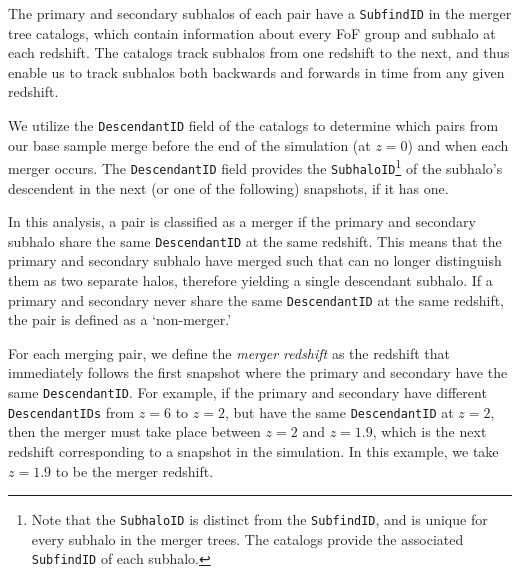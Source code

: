 \documentclass[twocolumn,linenumbers]{aastex631}
\begin{document}
The primary and secondary subhalos of each pair have a \texttt{SubfindID} in the \subfind{} merger tree catalogs, which contain information about every FoF group and subhalo at each redshift. 
The \sublink{} catalogs track subhalos from one redshift to the next, and thus enable us to track subhalos both backwards and forwards in time from any given redshift. 

We utilize the \texttt{DescendantID} field of the \sublink{} catalogs to determine which pairs from our base sample merge before the end of the simulation (at $z=0$) and when each merger occurs. 
The \texttt{DescendantID} field provides the \texttt{SubhaloID}\footnote{Note that the \texttt{SubhaloID} is distinct from the \texttt{SubfindID}, and is unique for every subhalo in the merger trees. 
The \sublink{} catalogs provide the associated \texttt{SubfindID} of each subhalo.} of the subhalo's descendent in the next (or one of the following) snapshots, if it has one. 

In this analysis, a pair is classified as a merger if the primary and secondary subhalo share the same \texttt{DescendantID} at the same redshift. 
This means that the primary and secondary subhalo have merged such that \subfind{} can no longer distinguish them as two separate halos, therefore yielding a single descendant subhalo.
If a primary and secondary never share the same \texttt{DescendantID} at the same redshift, the pair is defined as a `non-merger.'

For each merging pair, we define the \emph{merger redshift} as the redshift that immediately follows the first snapshot where the primary and secondary have the same \texttt{DescendantID}. 
For example, if the primary and secondary have different \texttt{DescendantIDs} from $z=6$ to $z=2$, but have the same \texttt{DescendantID} at $z=2$, then the merger must take place between $z=2$ and $z=1.9$, which is the next redshift corresponding to a snapshot in the simulation. 
In this example, we take $z=1.9$ to be the merger redshift. 
\end{document}
